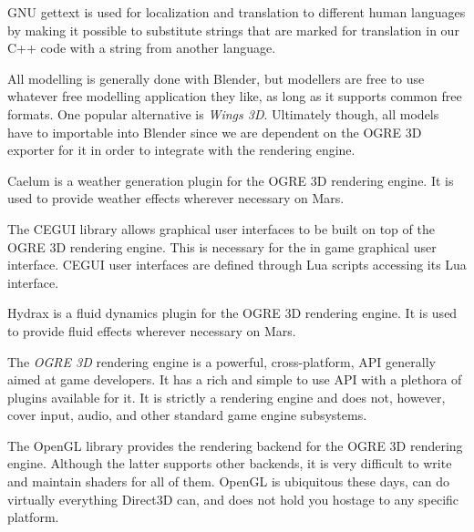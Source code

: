 
GNU gettext is used for localization and translation to different human languages by making it possible to substitute strings that are marked for translation in our C++ code with a string from another language.
\stopitemize


\startitemize[3]
\setupwhitespace[big]

All modelling is generally done with Blender, but modellers are free to use whatever free modelling application they like, as long as it supports common free formats. One popular alternative is {\it Wings 3D}. Ultimately though, all models have to importable into Blender since we are dependent on the OGRE 3D exporter for it in order to integrate with the rendering engine.


Caelum is a weather generation plugin for the OGRE 3D rendering engine. It is used to provide weather effects wherever necessary on Mars.


The CEGUI library allows graphical user interfaces to be built on top of the OGRE 3D rendering engine. This is necessary for the in game graphical user interface. CEGUI user interfaces are defined through Lua scripts accessing its Lua interface.


Hydrax is a fluid dynamics plugin for the OGRE 3D rendering engine. It is used to provide fluid effects wherever necessary on Mars.


The {\it OGRE 3D} rendering engine is a powerful, cross-platform, API generally aimed at game developers. It has a rich and simple to use API with a plethora of plugins available for it. It is strictly a rendering engine and does not, however, cover input, audio, and other standard game engine subsystems.


The OpenGL library provides the rendering backend for the OGRE 3D rendering engine. Although the latter supports other backends, it is very difficult to write and maintain shaders for all of them. OpenGL is ubiquitous these days, can do virtually everything Direct3D can, and does not hold you hostage to any specific platform.


